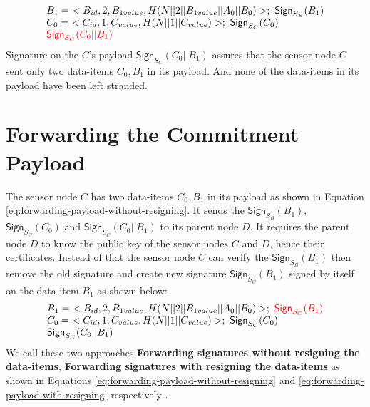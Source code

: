 		\begin{equation}	
			\begin{array}{l}
				B_{1} =\ <B_{id}, 2, B_{1value}, H(N||2||B_{1value}||A_{0}||B_{0})>;\ \textsf{Sign}_{S_{B}}(B_{1})\\
				C_{0} =\ <C_{id}, 1, C_{value}, H(N||1||C_{value})>;\ \textsf{Sign}_{S_{C}}(C_{0})\\
				\textcolor{red}{\textsf{Sign}_{S_{C}}(C_{0}||B_{1})}
			\end{array}
			\label{eq:forwarding-payload-without-resigning}
		\end{equation}
	Signature on the $C$'s payload $\textsf{Sign}_{S_{C}}(C_{0}||B_{1})$ assures that the sensor node $C$ sent only two data-items $C_{0},B_{1}$ in its payload.
	And none of the data-items in its payload have been left stranded.

\section{Forwarding the Commitment Payload}	
	The sensor node $C$ has two data-items $C_{0},B_{1}$ in its payload as shown in Equation \ref{eq:forwarding-payload-without-resigning}. 
	It sends the $\textsf{Sign}_{S_{B}}(B_{1})$, $\textsf{Sign}_{S_{C}}(C_{0}) $ and $\textsf{Sign}_{S_{C}}(C_{0}||B_{1})$ to its parent node $D$.
	It requires the parent node $D$ to know the public key of the sensor nodes $C$ and $D$, hence their certificates.
	Instead of that the sensor node $C$ can verify the $\textsf{Sign}_{S_{B}}(B_{1})$ then remove the old signature and create new signature $\textsf{Sign}_{S_{C}}(B_{1})$ signed by itself on the data-item $B_{1}$ as shown below:
\begin{equation}	
	\begin{array}{l}
		B_{1} =\ <B_{id}, 2, B_{1value}, H(N||2||B_{1value}||A_{0}||B_{0})>;\  \textcolor{red}{\textsf{Sign}_{S_{C}}(B_{1})}\\
		C_{0} =\ <C_{id}, 1, C_{value}, H(N||1||C_{value})>;\ \textsf{Sign}_{S_{C}}(C_{0})\\
		\textsf{Sign}_{S_{C}}(C_{0}||B_{1})
	\end{array}
	\label{eq:forwarding-payload-with-resigning}
\end{equation}
We call these two approaches \textbf{Forwarding signatures without resigning the data-items}, \textbf{Forwarding signatures with resigning the data-items} as shown in Equations \ref{eq:forwarding-payload-without-resigning} and \ref{eq:forwarding-payload-with-resigning} respectively .

